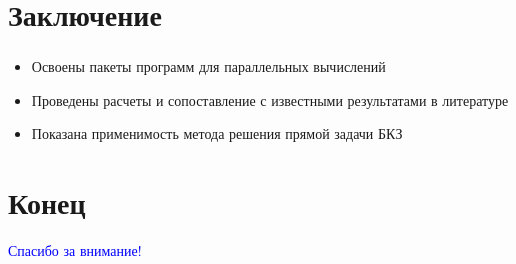 \section{Заключение}

\begin{frame}
\frametitle{\insertsection}

\begin{itemize}
    \item Освоены пакеты программ для параллельных вычислений
    \item Проведены расчеты и сопоставление с известными результатами в литературе
    \item Показана применимость метода решения прямой задачи БКЗ
\end{itemize}
\end{frame}


\section{Конец}

\begin{frame}
\centering
\vfill
\textcolor{Blue}{\Large Спасибо за внимание!}
\vfill
\end{frame}